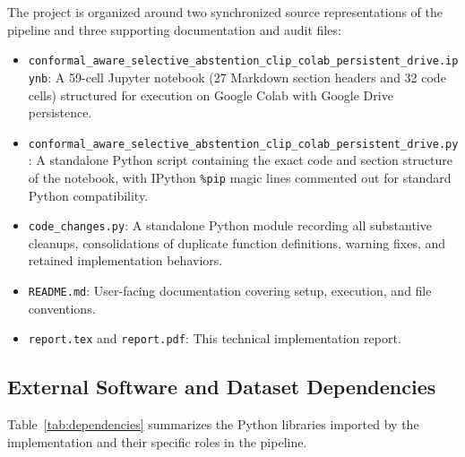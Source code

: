 \documentclass[11pt,a4paper]{article}
\begin{document}
The project is organized around two synchronized source representations of the pipeline and three supporting documentation and audit files:
\begin{itemize}
  \item \texttt{conformal\_\allowbreak{}aware\_\allowbreak{}selective\_\allowbreak{}abstention\_\allowbreak{}clip\_\allowbreak{}colab\_\allowbreak{}persistent\_\allowbreak{}drive.\allowbreak{}ipynb}: A 59-cell Jupyter notebook (27 Markdown section headers and 32 code cells) structured for execution on Google Colab with Google Drive persistence.
  \item \texttt{conformal\_\allowbreak{}aware\_\allowbreak{}selective\_\allowbreak{}abstention\_\allowbreak{}clip\_\allowbreak{}colab\_\allowbreak{}persistent\_\allowbreak{}drive.\allowbreak{}py}: A standalone Python script containing the exact code and section structure of the notebook, with IPython \texttt{\%pip} magic lines commented out for standard Python compatibility.
  \item \texttt{code\_\allowbreak{}changes.\allowbreak{}py}: A standalone Python module recording all substantive cleanups, consolidations of duplicate function definitions, warning fixes, and retained implementation behaviors.
  \item \texttt{README.\allowbreak{}md}: User-facing documentation covering setup, execution, and file conventions.
  \item \texttt{report.\allowbreak{}tex} and \texttt{report.\allowbreak{}pdf}: This technical implementation report.
\end{itemize}

\subsection{External Software and Dataset Dependencies}

Table~\ref{tab:dependencies} summarizes the Python libraries imported by the implementation and their specific roles in the pipeline.
\end{document}

